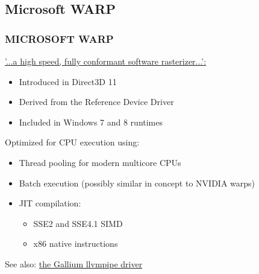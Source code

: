 \subsection{Microsoft WARP}
\begin{frame}
\frametitle{MICROSOFT WARP}

\href{http://msdn.microsoft.com/en-us/library/windows/desktop/gg615082(v=vs.85)%
  .aspx}{'...a high speed, fully conformant software rasterizer...':}
\begin{itemize}
\item Introduced in Direct3D 11
\item Derived from the Reference Device Driver
\item Included in Windows 7 and 8 runtimes
\end{itemize}

Optimized for CPU execution using:
\begin{itemize}
\item Thread pooling for modern multicore CPUs
\item Batch execution (possibly similar in concept to NVIDIA warps)
\item JIT compilation:
  \begin{itemize}
  \item SSE2 and SSE4.1 SIMD
  \item x86 native instructions
  \end{itemize}
\end{itemize}

See also: \href{http://www.mesa3d.org/llvmpipe.html}{the Gallium llvmpipe driver}

\end{frame}
